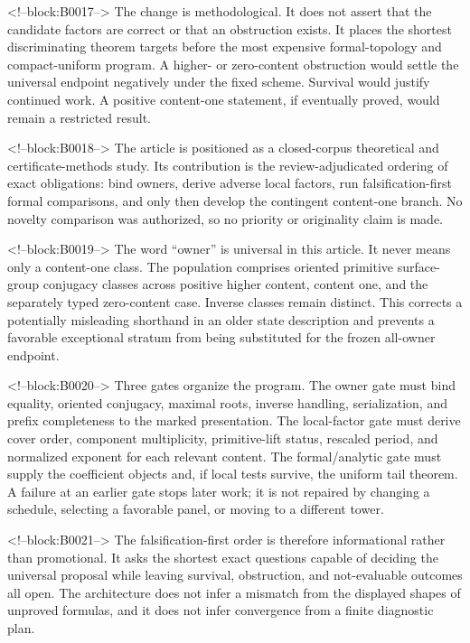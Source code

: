 \documentclass[11pt]{article}
\begin{document}
<!--block:B0017-->
The change is methodological. It does not assert that the candidate
factors are correct or that an obstruction exists. It places the
shortest discriminating theorem targets before the most expensive
formal-topology and compact-uniform program. A higher- or zero-content
obstruction would settle the universal endpoint negatively under the
fixed scheme. Survival would justify continued work. A positive
content-one statement, if eventually proved, would remain a restricted
result.

<!--block:B0018-->
The article is positioned as a closed-corpus theoretical and
certificate-methods study. Its contribution is the review-adjudicated
ordering of exact obligations: bind owners, derive adverse local
factors, run falsification-first formal comparisons, and only then
develop the contingent content-one branch. No novelty comparison was
authorized, so no priority or originality claim is made.

<!--block:B0019-->
The word ``owner'' is universal in this article. It never means only a
content-one class. The population comprises oriented primitive
surface-group conjugacy classes across positive higher content, content
one, and the separately typed zero-content case. Inverse classes remain
distinct. This corrects a potentially misleading shorthand in an older
state description and prevents a favorable exceptional stratum from
being substituted for the frozen all-owner endpoint.

<!--block:B0020-->
Three gates organize the program. The owner gate must bind equality,
oriented conjugacy, maximal roots, inverse handling, serialization, and
prefix completeness to the marked presentation. The local-factor gate
must derive cover order, component multiplicity, primitive-lift status,
rescaled period, and normalized exponent for each relevant content. The
formal/analytic gate must supply the coefficient objects and, if local
tests survive, the uniform tail theorem. A failure at an earlier gate
stops later work; it is not repaired by changing a schedule, selecting a
favorable panel, or moving to a different tower.

<!--block:B0021-->
The falsification-first order is therefore informational rather than
promotional. It asks the shortest exact questions capable of deciding
the universal proposal while leaving survival, obstruction, and
not-evaluable outcomes all open. The architecture does not infer a
mismatch from the displayed shapes of unproved formulas, and it does not
infer convergence from a finite diagnostic plan.
\end{document}
